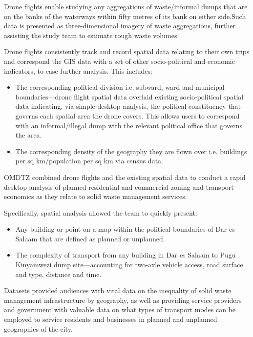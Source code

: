 \documentclass[a4paper,12pt,twoside]{article}
\begin{document}
    \lipsum[0-4]
  
    Drone flights enable studying any aggregations of waste/informal dumps that are on the banks of the waterways within fifty metres of its bank on either side.Such data is presented as three-dimensional imagery of waste aggregations, further assisting the study team to estimate rough waste volumes.
    
    Drone flights consistently track and record spatial data relating to their own trips and correspond the GIS data with a set of other socio-political and economic indicators, to ease further analysis. This includes:   
    
    \begin{itemize}
        \item The corresponding political division i.e. subward, ward and municipal boundaries—drone flight spatial data overlaid existing socio-political spatial data indicating, via simple desktop analysis, the political constituency that governs each spatial area the drone covers. This allows users to correspond with an informal/illegal dump with the relevant political office that governs the area.
        \item The corresponding density of the geography they are flown over i.e. buildings per sq km/population per sq km via census data. 
    \end{itemize}
    
    
    OMDTZ  combined drone flights and the existing spatial data to conduct a rapid desktop analysis of planned residential and commercial zoning and transport economics as they relate to solid waste management services.
    
    Specifically, spatial analysis allowed the team to quickly present:
    
    \begin{itemize}
        \item Any building or point on a map within the political boundaries of Dar es Salaam that are defined as planned or unplanned.
        \item The complexity of transport from any building in Dar es Salaam to Pugu Kinyamwezi dump site---accounting for two-axle vehicle access, road surface and type, distance and time. 
    \end{itemize}
        
    Datasets provided audiences with vital data on the inequality of solid waste management infrastructure by geography, as well as providing service providers and government with valuable data on what types of transport modes can be employed to service residents and businesses in planned and unplanned geographies of the city.  
    
\end{document}
